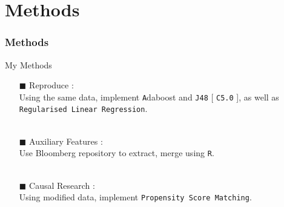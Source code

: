 \documentclass{beamer}
\begin{document}
\section {Methods}
\begin{frame}[t]
\frametitle{Methods}
My Methods
\begin{enumerate}
\item [$\blacksquare$]  Reproduce : \\Using the same data, implement {\texttt Adaboost} and \texttt{J48} [ \texttt{C5.0} ], as well as \texttt{Regularised Linear Regression}. \\~\\
\item [$\blacksquare$]  Auxiliary Features : \\ Use Bloomberg repository to extract, merge using {\texttt R}. \\~\\
\item [$\blacksquare$]  Causal Research : \\ Using modified data, implement \texttt{Propensity Score Matching}.  \\~\\
\end{enumerate}
\end{frame}
\end{document}

